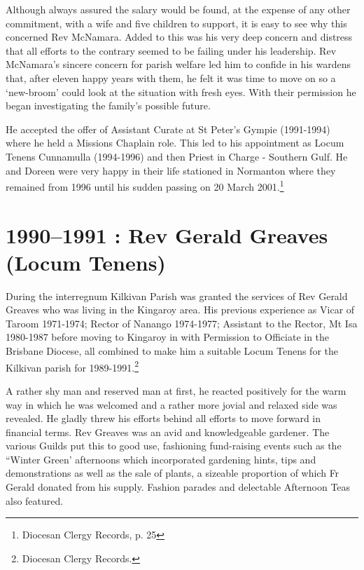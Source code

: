 Although always assured the salary would be found, at the expense of any other commitment, with a wife and five children to support, it is easy to see why this concerned Rev McNamara. Added to this was his very deep concern and distress that all efforts to the contrary seemed to be failing under his leadership. Rev McNamara's sincere concern for parish welfare led him to confide in his wardens that, after eleven happy years with them, he felt it was time to move on so a `new-broom' could look at the situation with fresh eyes. With their permission he began investigating the family's possible future.



He accepted the offer of Assistant Curate at St Peter's Gympie (1991-1994) where he held a Missions Chaplain role. This led to his appointment as Locum Tenens Cunnamulla (1994-1996) and then Priest in Charge - Southern Gulf. He and Doreen were very happy in their life stationed in Normanton where they remained from 1996 until his sudden passing on 20 March 2001.\footnote{Diocesan Clergy Records, p. 25}


\section{1990--1991 : Rev Gerald Greaves (Locum Tenens)}



During the interregnum Kilkivan Parish was granted the services of Rev Gerald Greaves who was living in the Kingaroy area. His previous experience as Vicar of Taroom 1971-1974; Rector of Nanango 1974-1977; Assistant to the Rector, Mt Isa 1980-1987 before moving to Kingaroy in with Permission to Officiate in the Brisbane Diocese, all combined to make him a suitable Locum Tenens for the Kilkivan parish for 1989-1991.\footnote{Diocesan Clergy Records.}


A rather shy man and reserved man at first, he reacted positively for the warm way in which he was welcomed and a rather more jovial and relaxed side was revealed. He gladly threw his efforts behind all efforts to move forward in financial terms. Rev Greaves was an avid and knowledgeable gardener. The various Guilds put this to good use, fashioning fund-raising events such as the ``Winter Green' afternoons which incorporated gardening hints, tips and demonstrations as well as the sale of plants, a sizeable proportion of which Fr Gerald donated from his supply. Fashion parades and delectable Afternoon Teas also featured.




